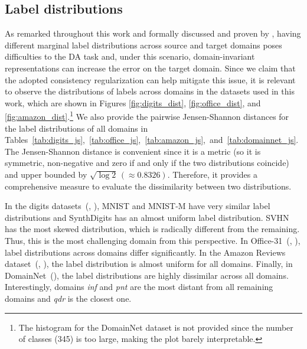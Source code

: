 \subsection{Label distributions}
\label{sec:label_dist}
As remarked throughout this work and formally discussed and proven by \citet{Zhao2019}, having different marginal label distributions across source and target domains poses difficulties to the DA task and, under this scenario, domain-invariant representations can increase the error on the target domain. Since we claim that the adopted consistency regularization can help mitigate this issue, it is relevant to observe the distributions of labels across domains in the datasets used in this work, which are shown in Figures \ref{fig:digits_dist}, \ref{fig:office_dist}, and \ref{fig:amazon_dist}.\footnote{The histogram for the DomainNet dataset is not provided since the number of classes (345) is too large, making the plot barely interpretable.} We also provide the pairwise Jensen-Shannon distances for the label distributions of all domains in Tables~\ref{tab:digits_js},~\ref{tab:office_js},~\ref{tab:amazon_js},~and~\ref{tab:domainnet_js}. The Jensen-Shannon distance is convenient since it is a metric (so it is symmetric, non-negative and zero if and only if the two distributions coincide) and upper bounded by $\sqrt{\log 2}\,(\approx 0.8326)$. Therefore, it provides a comprehensive measure to evaluate the dissimilarity between two distributions.

In the digits datasets~(, ), MNIST and MNIST-M have very similar label distributions and SynthDigits has an almost uniform label distribution. SVHN has the most skewed distribution, which is radically different from the remaining. Thus, this is the most challenging domain from this perspective. In Office-31~(, ), label distributions across domains differ significantly. In the Amazon Reviews dataset~(, ), the label distribution is almost uniform for all domains. Finally, in DomainNet~(), the label distributions are highly dissimilar across all domains. Interestingly, domains \textit{inf} and \textit{pnt} are the most distant from all remaining domains and \textit{qdr} is the closest one.

